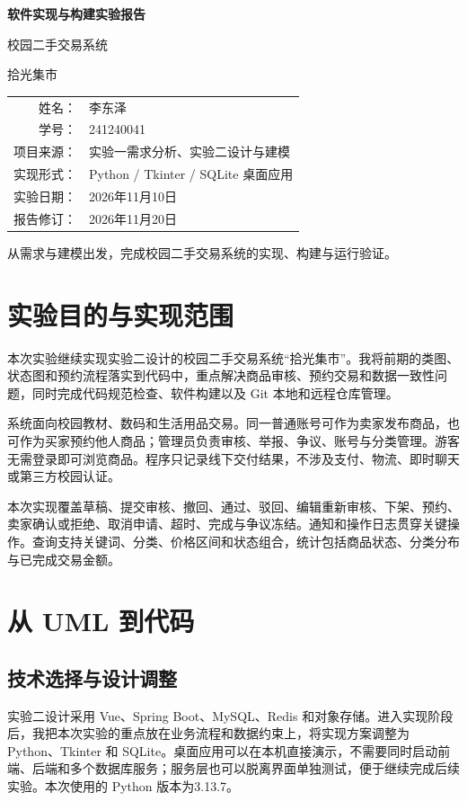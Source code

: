 \documentclass[11pt,a4paper]{ctexart}
\begin{document}
\begin{titlepage}
\centering
\vspace*{2.5cm}
{\Huge\bfseries 软件实现与构建实验报告\par}
\vspace{1.2cm}
{\LARGE 校园二手交易系统\par}
\vspace{0.5cm}
{\Large 拾光集市\par}
\vspace{2cm}
\begin{tabular}{rl}
姓名：&李东泽\\
学号：&241240041\\
项目来源：&实验一需求分析、实验二设计与建模\\
实现形式：&Python / Tkinter / SQLite 桌面应用\\
实验日期：&2026年11月10日\\
报告修订：&2026年11月20日\\
\end{tabular}
\vfill
从需求与建模出发，完成校园二手交易系统的实现、构建与运行验证。
\end{titlepage}
\tableofcontents
\clearpage

\section{实验目的与实现范围}
本次实验继续实现实验二设计的校园二手交易系统“拾光集市”。我将前期的类图、状态图和预约流程落实到代码中，重点解决商品审核、预约交易和数据一致性问题，同时完成代码规范检查、软件构建以及 Git 本地和远程仓库管理。

系统面向校园教材、数码和生活用品交易。同一普通账号可作为卖家发布商品，也可作为买家预约他人商品；管理员负责审核、举报、争议、账号与分类管理。游客无需登录即可浏览商品。程序只记录线下交付结果，不涉及支付、物流、即时聊天或第三方校园认证。

本次实现覆盖草稿、提交审核、撤回、通过、驳回、编辑重新审核、下架、预约、卖家确认或拒绝、取消申请、超时、完成与争议冻结。通知和操作日志贯穿关键操作。查询支持关键词、分类、价格区间和状态组合，统计包括商品状态、分类分布与已完成交易金额。

\section{从 UML 到代码}
\subsection{技术选择与设计调整}
实验二设计采用 Vue、Spring Boot、MySQL、Redis 和对象存储。进入实现阶段后，我把本次实验的重点放在业务流程和数据约束上，将实现方案调整为 Python、Tkinter 和 SQLite。桌面应用可以在本机直接演示，不需要同时启动前端、后端和多个数据库服务；服务层也可以脱离界面单独测试，便于继续完成后续实验。本次使用的 Python 版本为3.13.7。
\end{document}
